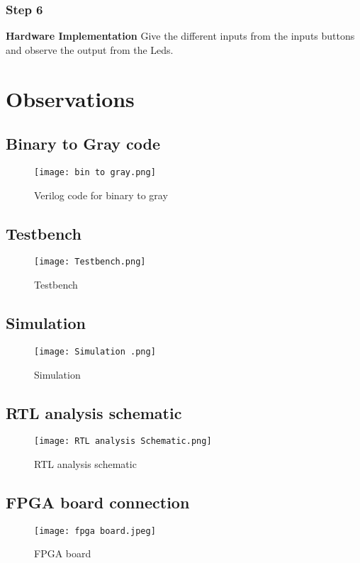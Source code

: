\documentclass{article}
\begin{document}
\subsubsection{Step 6}
\textbf{Hardware Implementation}
\newline 
Give the different inputs from the inputs buttons and observe the output from the Leds.



\newpage
\section{Observations}
\subsection{Binary to Gray code}
\begin{figure}[H]
    \centering
    \texttt{[image: bin to gray.png]}
    \caption{Verilog code for binary to gray}
    \label{fig:Verilog Code for binary to gray}
\end{figure}

\subsection{Testbench}
\begin{figure}[H]
    \centering
    \texttt{[image: Testbench.png]}
    \caption{Testbench}
    \label{fig:Testbench}
\end{figure}
\subsection{Simulation}
\begin{figure}[H]
    \centering
    \texttt{[image: Simulation .png]}
    \caption{Simulation}
    \label{fig:Simulation}
\end{figure}

\subsection{RTL analysis schematic}
\begin{figure}[H]
    \centering
    \texttt{[image: RTL analysis Schematic.png]}
    \caption{RTL analysis schematic}
    \label{fig:RTL analysis schematic}
\end{figure}

\subsection{FPGA board connection}
\begin{figure}[H]
    \centering
    \texttt{[image: fpga board.jpeg]}
    \caption{FPGA board}
    \label{fig:FPGA board}
\end{figure}
\end{document}
